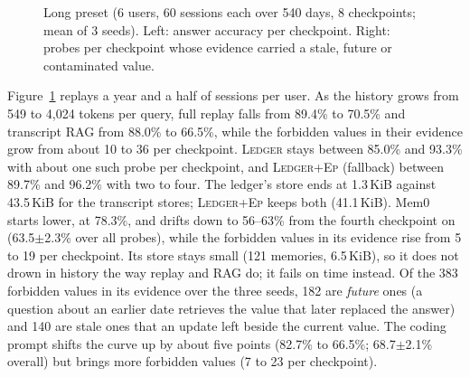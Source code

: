 \documentclass[10pt,conference]{IEEEtran}
\newcommand{\sys}{\textsc{Ledger}}
\newcommand{\hyb}{\textsc{Ledger+Ep}}
\begin{document}
\begin{figure}[t]
\caption{Long preset (6 users, 60 sessions each over 540 days, 8 checkpoints; mean of 3 seeds). Left: answer accuracy per checkpoint. Right: probes per checkpoint whose evidence carried a stale, future or contaminated value.}
\label{fig:long}
\end{figure}

Figure~\ref{fig:long} replays a year and a half of sessions per user. As the
history grows from 549 to 4{,}024 tokens per query, full replay falls from 89.4\%
to 70.5\% and transcript RAG from 88.0\% to 66.5\%, while the forbidden values in
their evidence grow from about 10 to 36 per checkpoint. \sys{} stays between
85.0\% and 93.3\% with about one such probe per checkpoint, and \hyb{}
(fallback) between 89.7\% and 96.2\% with two to four. The ledger's store ends at 1.3\,KiB against 43.5\,KiB for
the transcript stores; \hyb{} keeps both (41.1\,KiB).
Mem0 starts lower, at 78.3\%, and drifts down to 56--63\% from the fourth
checkpoint on (63.5$\pm$2.3\% over all probes), while the forbidden values in its
evidence rise from 5 to 19 per checkpoint. Its store stays small (121 memories,
6.5\,KiB), so it does not drown in history the way replay and RAG do; it fails
on time instead. Of the 383 forbidden values in its evidence over the three
seeds, 182 are \emph{future} ones (a
question about an earlier date retrieves the value that later replaced the
answer) and 140 are stale ones that an update left beside the current value. The coding prompt shifts the curve up by about five points
(82.7\% to 66.5\%; 68.7$\pm$2.1\% overall) but brings more forbidden values
(7 to 23 per checkpoint).
\end{document}
